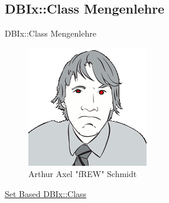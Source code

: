 










\subsection{DBIx::Class Mengenlehre}


\begin{frame}[fragile]{DBIx::Class Mengenlehre}
\begin{figure}[!ht]
\centering
\includegraphics[width=0.4\linewidth]{img/frew.png}
\caption{Arthur Axel "fREW" Schmidt}
\end{figure}
\centering
\href{http://www.perladvent.org/2012/2012-12-21.html}{Set Based DBIx::Class}
\end{frame}

